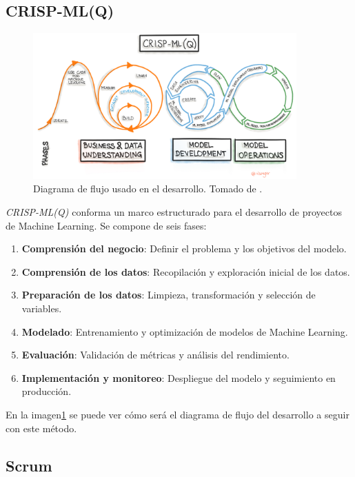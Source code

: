 \subsection{CRISP-ML(Q)}

\begin{figure}[H]
    \centering
    \includegraphics[width=0.9\textwidth]{images/crisp-ml-process.jpg}
    \caption{Diagrama de flujo usado en el desarrollo. Tomado de \cite{crispml}.}
    \label{fig:crispml-q-diagram}
  \end{figure}

\emph{CRISP-ML(Q)} conforma un marco estructurado para el desarrollo de proyectos de Machine Learning. Se compone de seis fases:

\begin{enumerate}
    \item \textbf{Comprensión del negocio}: Definir el problema y los objetivos del modelo.
    \item \textbf{Comprensión de los datos}: Recopilación y exploración inicial de los datos.
    \item \textbf{Preparación de los datos}: Limpieza, transformación y selección de variables.
    \item \textbf{Modelado}: Entrenamiento y optimización de modelos de Machine Learning.
    \item \textbf{Evaluación}: Validación de métricas y análisis del rendimiento.
    \item \textbf{Implementación y monitoreo}: Despliegue del modelo y seguimiento en producción.
\end{enumerate}

En la imagen\ref{fig:crispml-q-diagram} se puede ver cómo será el diagrama de flujo del desarrollo a seguir con este método.

\subsection{Scrum}

